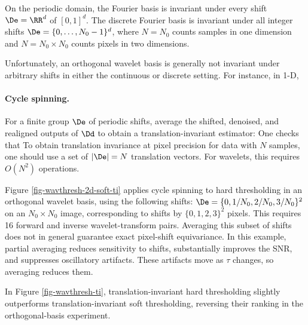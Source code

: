 On the periodic domain, the Fourier basis is invariant under every shift $\De=\RR^d$ of $[0,1]^d$. The discrete Fourier basis is invariant under all integer shifts $\De=\{0,\ldots,N_0-1\}^d$, where $N=N_0$ counts samples in one dimension and $N=N_0 \times N_0$ counts pixels in two dimensions.

Unfortunately, an orthogonal wavelet basis 
is generally not invariant under arbitrary shifts in either the continuous or discrete setting. For instance, in 1-D,

  
\paragraph{Cycle spinning.}

For a finite group $\De$ of periodic shifts, average the shifted, denoised, and realigned outputs of $\Dd$ to obtain a translation-invariant estimator:
One checks that
To obtain translation invariance at pixel precision for data with $N$ samples, one should use a set of $|\De|=N$ translation vectors. For wavelets, this requires $O(N^2)$ operations.

Figure \ref{fig-wavthresh-2d-soft-ti} applies cycle spinning to hard thresholding in an orthogonal wavelet basis, using the following shifts:
$\De = \{ 0, 1/N_0, 2/N_0, 3/N_0 \}^2$ on an $N_0\times N_0$ image, corresponding to shifts by $\{ 0, 1, 2, 3 \}^2$ pixels.
This requires 16 forward and inverse wavelet-transform pairs. Averaging this subset of shifts does not in general guarantee exact pixel-shift equivariance. In this example, partial averaging reduces sensitivity to shifts, substantially improves the SNR, and suppresses oscillatory artifacts. These artifacts move as $\tau$ changes, so averaging reduces them.

In Figure \ref{fig-wavthresh-ti}, translation-invariant hard thresholding slightly outperforms translation-invariant soft thresholding, reversing their ranking in the orthogonal-basis experiment.                                                                                               



